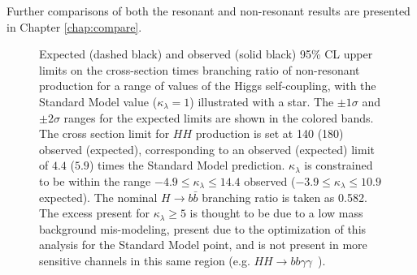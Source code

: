 Further comparisons of both the resonant and non-resonant results are presented in Chapter \ref{chap:compare}.

\begin{figure}[ht]
  \centering
  \caption{\label{fig:nonres-limits}
    Expected (dashed black) and observed (solid black) 95\% CL upper limits on the cross-section times 
    branching ratio of non-resonant production 
    for a range of values of the Higgs self-coupling, with the Standard Model value ($\kappa_{\lambda} = 1$) illustrated 
    with a star. The \(\pm 1\sigma\) and \(\pm 2\sigma\) ranges for the expected limits are shown in the colored bands. 
    The cross section limit for $HH$ production is set at \SI{140}{\fb} (\SI{180}{\fb}) observed (expected), 
    corresponding to an observed (expected) limit of $4.4$ ($5.9$) times the Standard Model prediction. 
    $\kappa_{\lambda}$ is constrained to be within the range $-4.9 \leq \kappa_{\lambda} \leq 14.4$ observed 
    ($-3.9 \leq \kappa_{\lambda} \leq 10.9$ expected). The nominal \(H \rightarrow b\bar{b}\) branching ratio is 
    taken as 0.582. The excess present for $\kappa_{\lambda}\geq 5$ is thought to be due to a low mass 
    background mis-modeling, present due to the optimization of this analysis for the Standard Model point, and is not present in more sensitive channels in this same region (e.g. $HH\rightarrow bb\gamma\gamma$~\cite{ATLAS-CONF-2021-016}).
  }
\end{figure}

